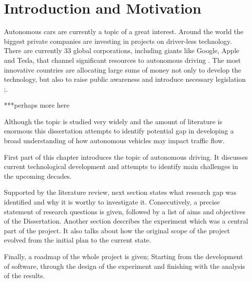 \documentclass[11pt,english]{article}
\begin{document}

\tableofcontents %

\newpage %



\section{Introduction and Motivation} %

\par
Autonomous cars are currently a topic of a great interest.  Around the world the biggest private companies are investing in projects on driver-less technology. There are currently 33 global corporations, including giants like Google, Apple and Tesla, that channel significant resources to autonomous driving \citep{33comp}. The most innovative countries are allocating large sums of money not only to develop the technology, but also to raise public awareness and introduce necessary legislation \citep{pathwaytodriverless};\citep{pathwaytodriverless2}. 

\par
***perhaps more here
\par
Although the topic is studied very widely and the amount of literature is enormous this dissertation attempts to identify potential gap in developing a broad understanding of how autonomous vehicles may impact traffic flow. 



\par
First part of this chapter introduces the topic of autonomous driving. It discusses current technological development and attempts to identify main challenges in the upcoming decades.  
\par
Supported by the literature review, next section states what research gap was identified and why it is worthy to investigate it. Consecutively, a precise statement of research questions is given, followed by a list of aims and objectives of the Dissertation. Another section describes the experiment which was a central part of the project. It also talks about how the original scope of the project evolved from the initial plan to the current state.
\par
Finally, a roadmap of the whole project is given; Starting from the development of software, through the design of the experiment and finishing with the analysis of the results.
\end{document}

